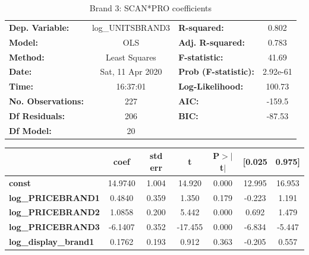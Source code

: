 \documentclass[a4paper,11pt]{article}
\begin{document}
\begin{center}
\begin{table}
\caption{Brand 3: SCAN*PRO coefficients}
\begin{tabular}{lclc}
\toprule
\textbf{Dep. Variable:}        & log\_UNITSBRAND3 & \textbf{  R-squared:         } &     0.802   \\
\textbf{Model:}                &       OLS        & \textbf{  Adj. R-squared:    } &     0.783   \\
\textbf{Method:}               &  Least Squares   & \textbf{  F-statistic:       } &     41.69   \\
\textbf{Date:}                 & Sat, 11 Apr 2020 & \textbf{  Prob (F-statistic):} &  2.92e-61   \\
\textbf{Time:}                 &     16:37:01     & \textbf{  Log-Likelihood:    } &    100.73   \\
\textbf{No. Observations:}     &         227      & \textbf{  AIC:               } &    -159.5   \\
\textbf{Df Residuals:}         &         206      & \textbf{  BIC:               } &    -87.53   \\
\textbf{Df Model:}             &          20      & \textbf{                     } &             \\
\bottomrule
\end{tabular}
\end{table}
\begin{tabular}{lcccccc}
                               & \textbf{coef} & \textbf{std err} & \textbf{t} & \textbf{P$> |$t$|$} & \textbf{[0.025} & \textbf{0.975]}  \\
\midrule
\textbf{const}                 &      14.9740  &        1.004     &    14.920  &         0.000        &       12.995    &       16.953     \\
\textbf{log\_PRICEBRAND1}      &       0.4840  &        0.359     &     1.350  &         0.179        &       -0.223    &        1.191     \\
\textbf{log\_PRICEBRAND2}      &       1.0858  &        0.200     &     5.442  &         0.000        &        0.692    &        1.479     \\
\textbf{log\_PRICEBRAND3}      &      -6.1407  &        0.352     &   -17.455  &         0.000        &       -6.834    &       -5.447     \\
\textbf{log\_display\_brand1}  &       0.1762  &        0.193     &     0.912  &         0.363        &       -0.205    &        0.557     \\

\end{tabular}
\end{center}
\end{document}
